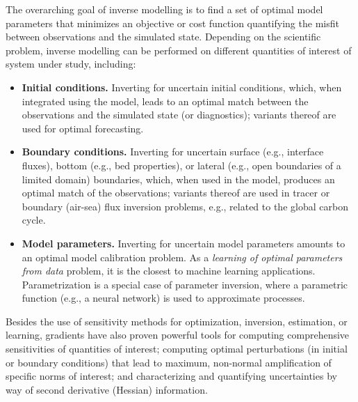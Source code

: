 The overarching goal of inverse modelling is to find a set of optimal model parameters that minimizes an objective or cost function quantifying the misfit between observations and the simulated state.
Depending on the scientific problem, inverse modelling can be performed on different quantities of interest of system under study, including:
\begin{itemize}
    \item \textbf{Initial conditions.} Inverting for uncertain initial conditions, which, when integrated using the model, leads to an optimal match between the observations and the simulated state (or diagnostics); variants thereof are used for optimal forecasting.
    \item \textbf{Boundary conditions.} Inverting for uncertain surface (e.g., interface fluxes), bottom (e.g., bed properties), or lateral (e.g., open boundaries of a limited domain) boundaries, which, when used in the model, produces an optimal match of the observations; variants thereof are used in tracer or boundary (air-sea) flux inversion problems, e.g., related to the global carbon cycle.
    \item \textbf{Model parameters.} Inverting for uncertain model parameters amounts to an optimal model calibration problem. As a \textit{learning of optimal parameters from data} problem, it is the closest to machine learning applications. Parametrization is a special case of parameter inversion, where a parametric function (e.g., a neural network) is used to approximate processes. 
\end{itemize}
Besides the use of sensitivity methods for optimization, inversion, estimation, or learning, gradients have also proven powerful tools for computing comprehensive sensitivities of quantities of interest; computing optimal perturbations (in initial or boundary conditions) that lead to maximum, non-normal amplification of specific norms of interest; and characterizing and quantifying uncertainties by way of second derivative (Hessian) information.

